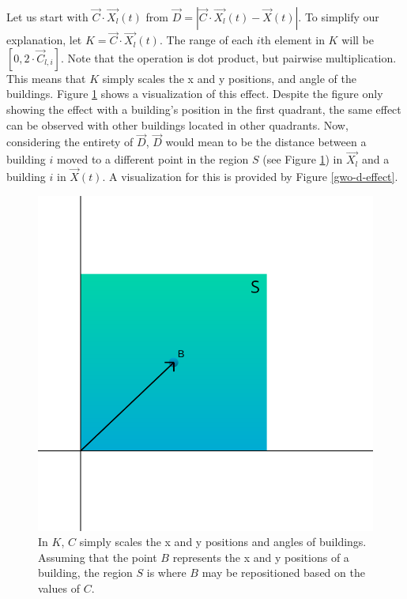 Let us start with $\vec{C} \cdot \vec{X_{l}}(t)$ from $\vec{D} = \left | \vec{C} \cdot \vec{X_{l}}(t) - \vec{X}(t) \right |$. To simplify our explanation, let $K = \vec{C} \cdot \vec{X_{l}}(t)$. The range of each $i$th element in $K$ will be $[0, 2 \cdot \vec{C}_{l,i}]$. Note that the operation is dot product, but pairwise multiplication. This means that $K$ simply scales the x and y positions, and angle of the buildings. Figure \ref{gwo-c-effect} shows a visualization of this effect. Despite the figure only showing the effect with a building's position in the first quadrant, the same effect can be observed with other buildings located in other quadrants. Now, considering the entirety of $\vec{D}$, $\vec{D}$ would mean to be the distance between a building $i$ moved to a different point in the region $S$ (see Figure \ref{gwo-c-effect}) in $\vec{X_{l}}$ and a building $i$ in $\vec{X}(t)$. A visualization for this is provided by Figure \ref{gwo-d-effect}.

\begin{figure}[h!]
	\centering
	\includegraphics[scale=0.45]{./images/chap05-methodology/gwo-c-effect.png}
	\caption{In $K$, $C$ simply scales the x and y positions and angles of buildings. Assuming that the point $B$ represents the x and y positions of a building, the region $S$ is where $B$ may be repositioned based on the values of $C$.}
	\label{gwo-c-effect}
\end{figure}

